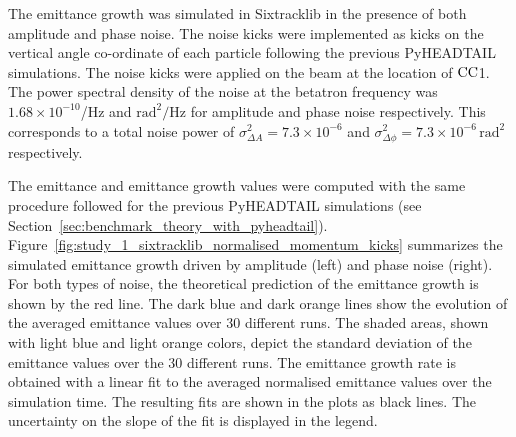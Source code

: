 The emittance growth was simulated in Sixtracklib in the presence of both amplitude and phase noise. The noise kicks were implemented as kicks on the vertical angle co-ordinate of each particle following the previous PyHEADTAIL simulations. The noise kicks were applied on the beam at the location of ${\mathrm{CC}}$1. The power spectral density of the noise at the betatron frequency was $1.68\times 10^{-10}$/Hz and $\mathrm{rad^2/Hz}$ for amplitude and phase noise respectively. This corresponds to a total noise power of $\sigma_{\Delta A}^2=7.3\times 10^{-6}$ and $\sigma_{\Delta \phi}^2=7.3\times 10^{-6}$\,$\mathrm{rad^2}$ respectively.


The emittance and emittance growth values were computed with the same procedure followed for the previous PyHEADTAIL simulations (see Section~\ref{sec:benchmark_theory_with_pyheadtail}). Figure~\ref{fig:study_1_sixtracklib_normalised_momentum_kicks} summarizes the simulated emittance growth driven by amplitude (left) and phase noise (right). For both types of noise, the theoretical prediction of the emittance growth is shown by the red line. The dark blue and dark orange lines show the evolution of the averaged emittance values over 30 different runs. The shaded areas, shown with light blue and light orange colors, depict the standard deviation of the emittance values over the 30 different runs. The emittance growth rate is obtained with a linear fit to the averaged normalised emittance values over the simulation time. The resulting fits are shown in the plots as black lines. The uncertainty on the slope of the fit is displayed in the legend.

